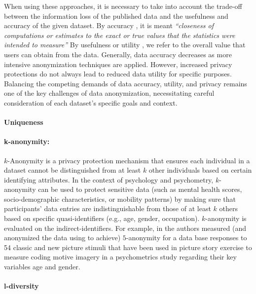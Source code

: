 \documentclass{article}
\begin{document}
When using these approaches, it is necessary to take into account the trade-off between the information loss of the published data and the usefulness and accuracy of the given dataset.
By accuracy \cite{2008_OECD}, it is meant \textit{“closeness of computations or estimates to the exact or true values that the statistics were intended to measure”}
By usefulness or utility \cite{2023_NIST}, we refer to the overall value that users can obtain from the data.
Generally, data accuracy decreases as more intensive anonymization techniques are applied. 
However, increased privacy protections do not always lead to reduced data utility for specific purposes. 
Balancing the competing demands of data accuracy, utility, and privacy remains one of the key challenges of data anonymization, necessitating careful consideration of each dataset's specific goals and context.

\paragraph{Uniqueness}

\paragraph{k-anonymity:}

\color{blue}
$k$-Anonymity is a privacy protection mechanism that ensures each individual in a dataset cannot be distinguished from at least $k$  other individuals based on certain identifying attributes. In the context of psychology and psychometry, $k$-anonymity can be used to protect sensitive data (such as mental health scores, socio-demographic characteristics, or mobility patterns) by making sure that participants’ data entries are indistinguishable from those of at least $k$  others based on specific quasi-identifiers (e.g., age, gender, occupation).  $k$-anonymity is evaluated on the indirect-identifiers. For example, in \citep{schoenbrodt21} the authors measured (and anonymized the data using \cite{2024_Sdcmicro} to achieve) $5$-anonymity for a data base responses to 54 classic and new picture stimuli that have
been used in picture story exercise to measure coding motive imagery in a psychometrics study regarding their key variables age and gender.
\color{black}

\paragraph{l-diversity}
\end{document}

